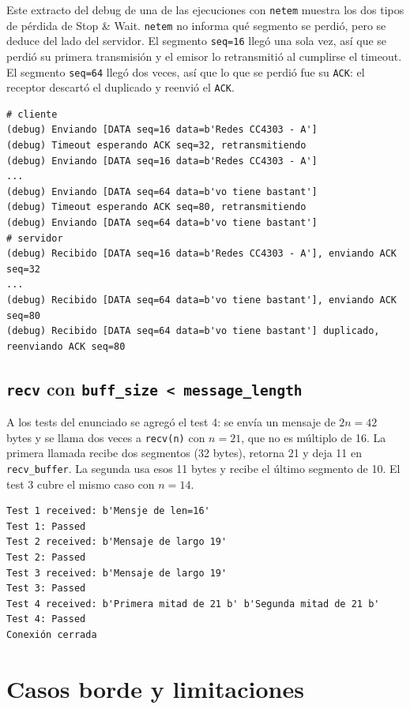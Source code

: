 \documentclass[11pt,letterpaper]{article}
\begin{document}
Este extracto del debug de una de las ejecuciones con \texttt{netem} muestra los dos
tipos de pérdida de Stop \& Wait. \texttt{netem} no informa qué segmento se perdió, pero
se deduce del lado del servidor. El segmento \texttt{seq=16} llegó una sola vez, así que
se perdió su primera transmisión y el emisor lo retransmitió al cumplirse el timeout. El
segmento \texttt{seq=64} llegó dos veces, así que lo que se perdió fue su
\texttt{ACK}: el receptor descartó el duplicado y reenvió el \texttt{ACK}.

\begin{lstlisting}
# cliente
(debug) Enviando [DATA seq=16 data=b'Redes CC4303 - A']
(debug) Timeout esperando ACK seq=32, retransmitiendo
(debug) Enviando [DATA seq=16 data=b'Redes CC4303 - A']
...
(debug) Enviando [DATA seq=64 data=b'vo tiene bastant']
(debug) Timeout esperando ACK seq=80, retransmitiendo
(debug) Enviando [DATA seq=64 data=b'vo tiene bastant']
# servidor
(debug) Recibido [DATA seq=16 data=b'Redes CC4303 - A'], enviando ACK seq=32
...
(debug) Recibido [DATA seq=64 data=b'vo tiene bastant'], enviando ACK seq=80
(debug) Recibido [DATA seq=64 data=b'vo tiene bastant'] duplicado, reenviando ACK seq=80
\end{lstlisting}

\subsection{\texttt{recv} con \texttt{buff\_size < message\_length}}

A los tests del enunciado se agregó el test 4: se envía un mensaje de $2n = 42$ bytes y
se llama dos veces a \texttt{recv(n)} con $n = 21$, que no es múltiplo de 16. La primera
llamada recibe dos segmentos (32 bytes), retorna 21 y deja 11 en \texttt{recv\_buffer}.
La segunda usa esos 11 bytes y recibe el último segmento de 10. El test 3 cubre el mismo
caso con $n = 14$.

\begin{lstlisting}
Test 1 received: b'Mensje de len=16'
Test 1: Passed
Test 2 received: b'Mensaje de largo 19'
Test 2: Passed
Test 3 received: b'Mensaje de largo 19'
Test 3: Passed
Test 4 received: b'Primera mitad de 21 b' b'Segunda mitad de 21 b'
Test 4: Passed
Conexión cerrada
\end{lstlisting}

\section{Casos borde y limitaciones}
\end{document}
